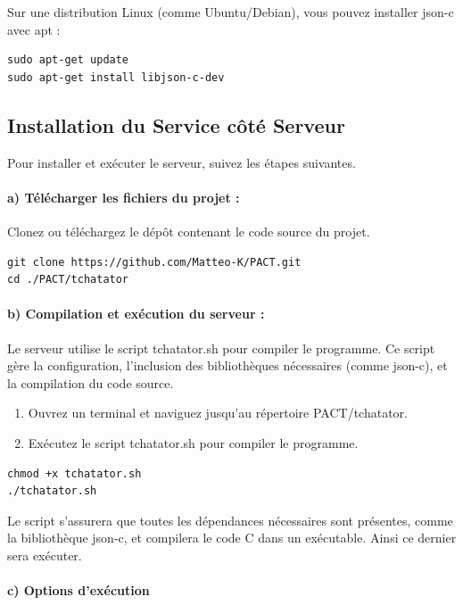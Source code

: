 \documentclass{report}
\begin{document}
Sur une distribution Linux (comme Ubuntu/Debian), vous pouvez installer json-c avec apt :

\begin{verbatim}
sudo apt-get update
sudo apt-get install libjson-c-dev
\end{verbatim}

\subsection{Installation du Service côté Serveur}

Pour installer et exécuter le serveur, suivez les étapes suivantes.

\paragraph{a) Télécharger les fichiers du projet :}

Clonez ou téléchargez le dépôt contenant le code source du projet.

\begin{verbatim}
git clone https://github.com/Matteo-K/PACT.git
cd ./PACT/tchatator
\end{verbatim}

\paragraph{b) Compilation et exécution du serveur :} Le serveur utilise le script tchatator.sh pour compiler le programme. Ce script gère la configuration, l'inclusion des bibliothèques nécessaires (comme json-c), et la compilation du code source.

\begin{enumerate}
	\item Ouvrez un terminal et naviguez jusqu'au répertoire PACT/tchatator.
	\item Exécutez le script tchatator.sh pour compiler le programme.
\end{enumerate}

\begin{verbatim}
chmod +x tchatator.sh
./tchatator.sh
\end{verbatim}

Le script s'assurera que toutes les dépendances nécessaires sont présentes, comme la bibliothèque json-c, et compilera le code C dans un exécutable. Ainsi ce dernier sera exécuter.

\paragraph{c) Options d'exécution}
\end{document}
